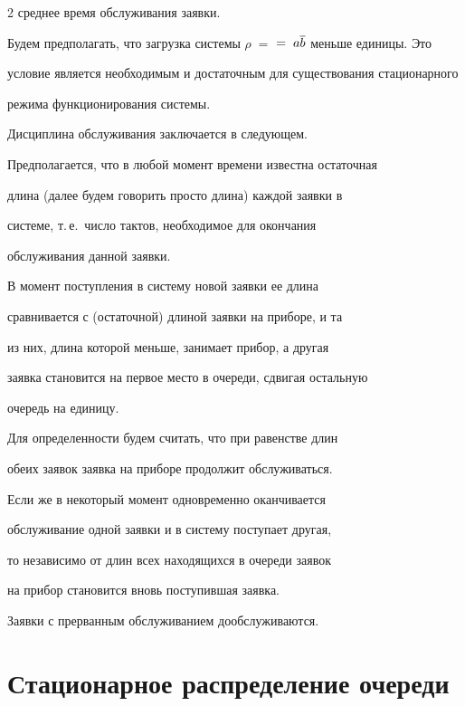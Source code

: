 \begin{multicols}{2}
среднее время обслуживания заявки.





Будем предполагать, что загрузка системы $\rho\;=$ $=\;a\overline b$ меньше единицы. Это 


условие является необходимым и достаточным для существования стационарного 


режима функционирования системы.











Дисциплина обслуживания заключается в следующем.


Предполагается, что в любой момент времени известна остаточная


длина (далее будем говорить просто длина) каждой заявки в


системе, т.\,е.\ число тактов, необходимое для окончания


обслуживания данной заявки.


В момент поступления в систему новой заявки ее длина


сравнивается с (остаточной) длиной заявки на приборе, и та


из них, длина которой меньше, занимает прибор, а другая


заявка становится на первое место в очереди, сдвигая остальную


очередь на единицу.


Для определенности будем считать, что при равенстве длин


обеих заявок заявка на приборе продолжит обслуживаться.


Если же в некоторый момент одновременно оканчивается


обслуживание одной заявки и в систему поступает другая,


то независимо от длин всех находящихся в очереди заявок


на прибор становится вновь поступившая заявка.


Заявки с прерванным обслуживанием дообслуживаются.





\section{Стационарное распределение очереди}






\end{multicols}
